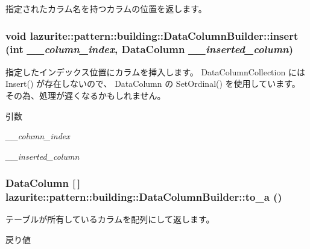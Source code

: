 \label{classlazurite_1_1pattern_1_1building_1_1_data_column_builder_ad4698f066eb2b013b40307ec533a7a2d}
指定されたカラム名を持つカラムの位置を返します。 \hypertarget{classlazurite_1_1pattern_1_1building_1_1_data_column_builder_a6d6a28d827fc717ad999c558a2768f63}{
\subsubsection[{insert}]{\setlength{\rightskip}{0pt plus 5cm}void lazurite::pattern::building::DataColumnBuilder::insert (int {\em \_\-\_\-column\_\-index}, \/  DataColumn {\em \_\-\_\-inserted\_\-column})}}
\label{classlazurite_1_1pattern_1_1building_1_1_data_column_builder_a6d6a28d827fc717ad999c558a2768f63}


指定したインデックス位置にカラムを挿入します。 DataColumnCollection には Insert() が存在しないので、 DataColumn の SetOrdinal() を使用しています。 その為、処理が遅くなるかもしれません。 
\begin{DoxyParams}{引数}
\item[{\em \_\-\_\-column\_\-index}]\item[{\em \_\-\_\-inserted\_\-column}]\end{DoxyParams}
\hypertarget{classlazurite_1_1pattern_1_1building_1_1_data_column_builder_a416334d362cadcbf08f23dcc5ad0a469}{
\subsubsection[{to\_\-a}]{\setlength{\rightskip}{0pt plus 5cm}DataColumn \mbox{[}$\,$\mbox{]} lazurite::pattern::building::DataColumnBuilder::to\_\-a ()}}
\label{classlazurite_1_1pattern_1_1building_1_1_data_column_builder_a416334d362cadcbf08f23dcc5ad0a469}


テーブルが所有しているカラムを配列にして返します。 \begin{DoxyReturn}{戻り値}

\end{DoxyReturn}



